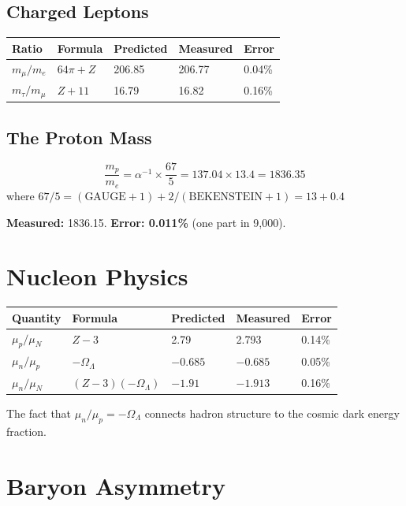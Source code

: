 \documentclass[11pt,a4paper]{article}
\theoremstyle{plain}
\theoremstyle{definition}
\theoremstyle{remark}
\newcommand{\OmegaL}{\Omega_\Lambda}
\newcommand{\GAUGE}{\text{GAUGE}}
\newcommand{\BEK}{\text{BEKENSTEIN}}
\begin{document}
\subsection{Charged Leptons}

\begin{table}[h!]
\centering
\begin{tabular}{lllll}
\toprule
\textbf{Ratio} & \textbf{Formula} & \textbf{Predicted} & \textbf{Measured} & \textbf{Error} \\
\midrule
$m_\mu/m_e$ & $64\pi + Z$ & 206.85 & 206.77 & 0.04\% \\
$m_\tau/m_\mu$ & $Z + 11$ & 16.79 & 16.82 & 0.16\% \\
\bottomrule
\end{tabular}
\end{table}

\subsection{The Proton Mass}

\[
\frac{m_p}{m_e} = \alpha^{-1} \times \frac{67}{5} = 137.04 \times 13.4 = 1836.35
\]
where $67/5 = (\GAUGE + 1) + 2/(\BEK + 1) = 13 + 0.4$

\textbf{Measured:} 1836.15. \textbf{Error: 0.011\%} (one part in 9,000).

\section{Nucleon Physics}

\begin{table}[h!]
\centering
\begin{tabular}{lllll}
\toprule
\textbf{Quantity} & \textbf{Formula} & \textbf{Predicted} & \textbf{Measured} & \textbf{Error} \\
\midrule
$\mu_p/\mu_N$ & $Z - 3$ & 2.79 & 2.793 & 0.14\% \\
$\mu_n/\mu_p$ & $-\OmegaL$ & $-0.685$ & $-0.685$ & 0.05\% \\
$\mu_n/\mu_N$ & $(Z-3)(-\OmegaL)$ & $-1.91$ & $-1.913$ & 0.16\% \\
\bottomrule
\end{tabular}
\end{table}

The fact that $\mu_n/\mu_p = -\OmegaL$ connects hadron structure to the cosmic dark energy fraction.

\section{Baryon Asymmetry}
\end{document}
